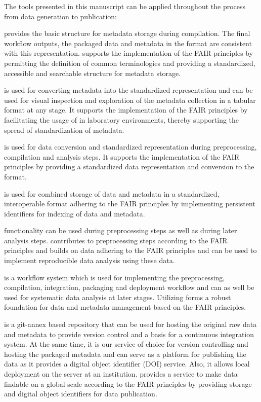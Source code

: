 The tools presented in this manuscript can be applied throughout the process from data generation to publication:
\begin{description}
 \setlength\itemsep{0pt}
 \item[\software{odML}] provides the basic structure for metadata storage during compilation. The final workflow outputs, the packaged data and metadata in the  format are consistent with this representation.  supports the implementation of the FAIR principles by permitting the definition of common terminologies and providing a standardized, accessible and searchable structure for metadata storage. 
 \item[\software{odMLtables}] is used for converting metadata into the standardized  representation and can be used for visual inspection and exploration of the metadata collection in a tabular format at any stage. It supports the implementation of the FAIR principles by facilitating the usage of  in laboratory environments, thereby supporting the spread of standardization of metadata.
 \item[\software{Neo}] is used for data conversion and standardized representation during preprocessing, compilation and analysis steps. It supports the implementation of the FAIR principles by providing a standardized data representation and conversion to the  format.
 \item[\software{Nix}] is used for combined storage of data and metadata in a standardized, interoperable format adhering to the FAIR principles  by implementing persistent identifiers for indexing of data and metadata.
 \item[\software{Elephant}] functionality can be used during preprocessing steps as well as during later analysis steps.  contributes to preprocessing steps according to the FAIR principles and builds on data adhering to the FAIR principles and can be used to implement reproducible data analysis using these data.
 \item[\software{snakemake}] is a workflow system which is used for implementing the preprocessing, compilation, integration, packaging and deployment workflow and can as well be used for systematic data analysis at later stages. Utilizing  forms a robust foundation for data and metadata management based on the FAIR principles.
 \item[\software{Gin}] is a git-annex based repository that can be used for hosting the original raw data and metadata to provide version control and a basis for a continuous integration system. At the same time, it is our service of choice for version controlling and hosting the packaged metadata and can serve as a platform for publishing the data as it provides a digital object identifier (DOI) service. Also, it allows local deployment on the server at an institution.  provides a service to make data findable on a global scale according to the FAIR principles by providing storage and digital object identifiers for data publication.
\end{description}
